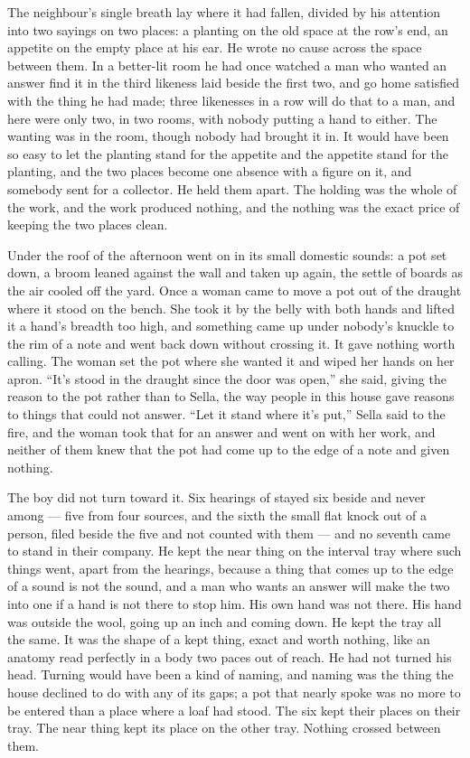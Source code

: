 The neighbour's single breath lay where it had fallen, divided by his attention into two sayings on two places: a planting on the old space at the row's end, an appetite on the empty place at his ear. He wrote no cause across the space between them. In a better-lit room he had once watched a man who wanted an answer find it in the third likeness laid beside the first two, and go home satisfied with the thing he had made; three likenesses in a row will do that to a man, and here were only two, in two rooms, with nobody putting a hand to either. The wanting was in the room, though nobody had brought it in. It would have been so easy to let the planting stand for the appetite and the appetite stand for the planting, and the two places become one absence with a figure on it, and somebody sent for a collector. He held them apart. The holding was the whole of the work, and the work produced nothing, and the nothing was the exact price of keeping the two places clean.

Under the roof of  the afternoon went on in its small domestic sounds: a pot set down, a broom leaned against the wall and taken up again, the settle of boards as the air cooled off the yard. Once a woman came to move a pot out of the draught where it stood on the bench. She took it by the belly with both hands and lifted it a hand's breadth too high, and something came up under nobody's knuckle to the rim of a note and went back down without crossing it. It gave nothing worth calling. The woman set the pot where she wanted it and wiped her hands on her apron. “It's stood in the draught since the door was open,” she said, giving the reason to the pot rather than to Sella, the way people in this house gave reasons to things that could not answer. “Let it stand where it's put,” Sella said to the fire, and the woman took that for an answer and went on with her work, and neither of them knew that the pot had come up to the edge of a note and given nothing.

The boy did not turn toward it. Six hearings of  stayed six beside and never among --- five from four sources, and the sixth the small flat knock out of a person, filed beside the five and not counted with them --- and no seventh came to stand in their company. He kept the near thing on the interval tray where such things went, apart from the hearings, because a thing that comes up to the edge of a sound is not the sound, and a man who wants an answer will make the two into one if a hand is not there to stop him. His own hand was not there. His hand was outside the wool, going up an inch and coming down. He kept the tray all the same. It was the shape of a kept thing, exact and worth nothing, like an anatomy read perfectly in a body two paces out of reach. He had not turned his head. Turning would have been a kind of naming, and naming was the thing the house declined to do with any of its gaps; a pot that nearly spoke was no more to be entered than a place where a loaf had stood. The six kept their places on their tray. The near thing kept its place on the other tray. Nothing crossed between them.

